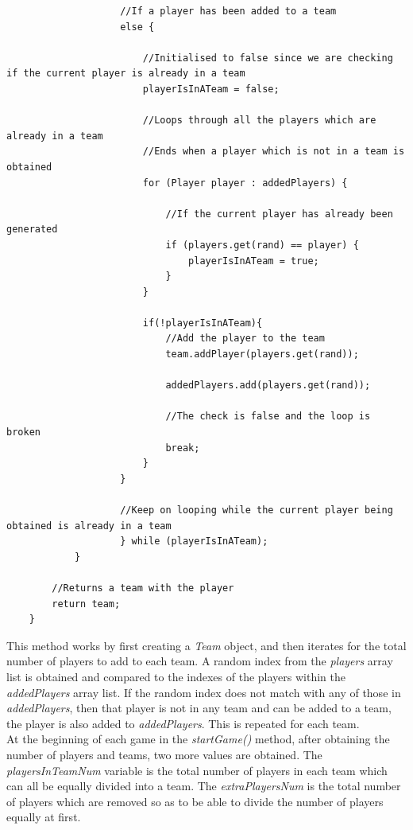 \documentclass[a4paper,12pt]{extarticle}
\begin{document}
\begin{lstlisting}
                    //If a player has been added to a team
                    else {

                        //Initialised to false since we are checking if the current player is already in a team
                        playerIsInATeam = false;

                        //Loops through all the players which are already in a team
                        //Ends when a player which is not in a team is obtained
                        for (Player player : addedPlayers) {

                            //If the current player has already been generated
                            if (players.get(rand) == player) {
                                playerIsInATeam = true;
                            }
                        }

                        if(!playerIsInATeam){
                            //Add the player to the team
                            team.addPlayer(players.get(rand));

                            addedPlayers.add(players.get(rand));

                            //The check is false and the loop is broken
                            break;
                        }
                    }

                    //Keep on looping while the current player being obtained is already in a team
                    } while (playerIsInATeam);
            }

        //Returns a team with the player
        return team;
    }
\end{lstlisting}

\noindent This method works by first creating a \textit{Team} object, and then iterates for the total number of players to add to each team. A random index from the \textit{players} array list is obtained and compared to the indexes of the players within the \textit{addedPlayers} array list. If the random index does not match with any of those in \textit{addedPlayers}, then that player is not in any team and can be added to a team, the player is also added to \textit{addedPlayers}. This is repeated for each team.\\

\noindent At the beginning of each game in the \textit{startGame()} method, after obtaining the number of players and teams, two more values are obtained. The \textit{playersInTeamNum} variable is the total number of players in each team which can all be equally divided into a team. The \textit{extraPlayersNum} is the total number of players which are removed so as to be able to divide the number of players equally at first. 
\end{document}
